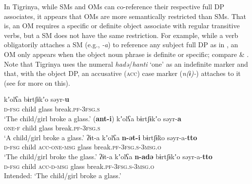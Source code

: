 \documentclass[output=paper]{langscibook}
\begin{document}
In Tigrinya, while SMs and OMs can co-reference their respective full DP associates, it appears that OMs are more semantically restricted than SMs. That is, an OM requires a specific or definite object associate with regular transitive verbs, but a SM does not have the same restriction.
For example, while a verb obligatorily attaches a SM (e.g., \emph{-a}) to reference any subject full DP as in , an OM only appears when the object noun phrase is definite or specific; compare  \& . Note that Tigrinya uses the numeral \emph{hadə}/\emph{hanti}  `one' as an indefinite marker and that, with the object DP, an accusative ({\scshape acc}) case marker (\emph{n(ɨ)-}) attaches to it (see  for more on this). 

\ea\label{ex:Gebregziabher:indefdef}
\ea\label{ex:Gebregziabher:dom1} 
 kʼolʕa bɨrtʃɨkʼo səyr-{\textbf{u}} \\
{\scshape d-fsg} child glass break.{\scshape pf-3fsg.s}\\
\glt `The child/girl broke a glass.'
\ex\label{ex:Gebregziabher:dom2}
\gll ({\textbf{\textcrh ant-i}}) kʼolʕa bɨrtʃɨkʼo səyr-{\textbf{a}} \\
{\scshape one-f} child glass break.{\scshape pf-3fsg.s}\\
\glt `A child/girl broke a glass.'
\z
\ex\label{ex:Gebregziabher:defdef}
\ea\label{ex:Gebregziabher:dom3} 
\gll ʔɨt-a kʼolʕa {\textbf{n-ət-i}} bɨrtʃɨk̈o səyr-a-{\textbf{tto}} \\
{\scshape d-fsg} child {\scshape acc-one-msg} glass break.{\scshape pf-3fsg.s-3msg.o} \\
\glt `The child/girl broke the glass.'
\ex\label{ex:Gebregziabher:dom4}
\gll *ʔɨt-a kʼolʕa {\textbf{n-\textcrh adə}} bɨrtʃɨkʼo səyr-a-{\textbf{tto}} \\
{\scshape d-fsg} child {\scshape acc-d-msg} glass break.{\scshape pf-3fsg.s-3msg.o}\\
\glt Intended: `The child/girl broke a glass.'
\z
\z
\end{document}
